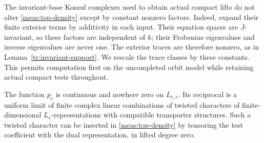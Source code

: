 The invariant-base Koszul complexes used to obtain actual compact lifts
do not alter \eqref{meas:top-density} except by constant nonzero factors.
Indeed, expand their finite exterior terms by additivity in each input.
Their equation spaces are $J$-invariant, so these factors are independent
of $k$; their Frobenius eigenvalues and inverse eigenvalues are never one.
The exterior traces are therefore nonzero, as in
Lemma~\ref{tr:invariant-support}.  We rescale the trace classes by these
constants.  This permits computation first on the uncompleted orbit model
while retaining actual compact tests throughout.

\begin{lemma}
\label{meas:cancel-density}
The function $p_e$ is continuous and nowhere zero on $L_{e,c}$.  Its
reciprocal is a uniform limit of finite complex linear combinations of
twisted characters of finite-dimensional $L_e$-representations with
compatible transporter structures.  Such a twisted character can be
inserted in \eqref{meas:top-density} by tensoring the test coefficient with
the dual representation, in lifted degree zero.
\end{lemma}

